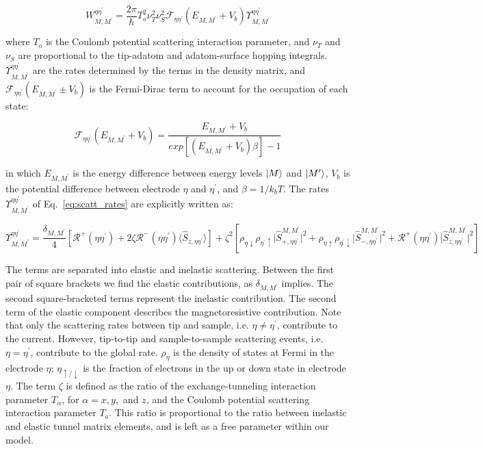 \documentclass[reprint,amsmath,amssymb,aps,nofootinbib,onecolumn]{revtex4-2}
\begin{document}
\begin{equation}
W_{M,M^{\prime}}^{\eta \eta^{\prime}}=\frac{2 \pi}{\hbar} T_o^2 \nu_T^2 \nu_S^2 \mathcal{F}_{\eta\eta^{\prime}}(E_{M,M^{\prime}} + V_{b})\Upsilon^{\eta\eta^{\prime}}_{M,M^{\prime}}
\label{eq:scatt_rates}
\end{equation}

where $T_{o}$ is the Coulomb potential scattering interaction parameter, and $\nu_T$ and $\nu_S$ are proportional to the tip-adatom and adatom-surface hopping integrals. 
$\Upsilon^{\eta\eta^{\prime}}_{M,M^{\prime}}$ are the rates determined by the terms in the density matrix, and $\mathcal{F}_{\eta\eta^{\prime}}(E_{M,M^{\prime}}\pm V_b )$ is the Fermi-Dirac term to account for the occupation of each state:

\begin{equation}
\mathcal{F}_{\eta\eta^{\prime}}(E_{M,M^{\prime}}+ V_{b} )=\dfrac{E_{M,M^{\prime}}+ V_{b}}{exp\left[\left( E_{M,M^{\prime}}+ V_{b}  \right)\beta\right]-1}
\label{eq:fermi_conv}
\end{equation}

in which $E_{M,M^{\prime}}$ is the energy difference between energy levels $\ket{M}$ and $\ket{M^{\prime}}$, $V_{b}$ is the potential difference between electrode $\eta$ and $\eta^{\prime}$, and $\beta=1/k_b T$. The rates $\Upsilon^{\eta\eta^{\prime}}_{M,M^{\prime}}$ of Eq.~\ref{eq:scatt_rates} are explicitly written as:

\begin{equation}
\label{eq:ups} 
    \Upsilon^{\eta\eta^{\prime}}_{M,M^{\prime}}=\dfrac{\delta_{M,M^{\prime}}}{4}\left[  \mathcal{R}^{+}(\eta\eta^{\prime})+ 2\zeta \mathcal{R}^{-}(\eta\eta^{\prime})\langle \hat{S}_{z,\eta\eta^{\prime}} \rangle \right] + \zeta^{2}\left[ \rho_{\eta \downarrow} \rho_{\eta^{\prime}\uparrow} \lvert \hat{S}_{+,\eta\eta^{\prime}}^{M,M^{\prime}}\rvert^{2} + \rho_{\eta \uparrow} \rho_{\eta^{\prime}\downarrow} \lvert {\hat{S}_{-,\eta\eta^{\prime}}^{M,M^{\prime}}}\rvert^{2} +\mathcal{R}^{+}(\eta\eta^{\prime})\lvert \hat{S}_{z,\eta\eta^{\prime}}^{M,M^{\prime}}\rvert^{2} \right]
\end{equation}

The terms are separated into elastic and inelastic scattering. Between the first pair of square brackets we find the elastic contributions, as $\delta_{M,M^{\prime}}$ implies. The second square-bracketed terms represent the inelastic contribution.
The second term of the elastic component describes the magnetoresistive contribution. Note that only the scattering rates between tip and sample, i.e. $\eta\neq\eta^{\prime}$, contribute to the current. However, tip-to-tip and sample-to-sample scattering events, i.e. $\eta=\eta^{\prime}$, contribute to the global rate. $\rho_{\eta}$ is the density of states at Fermi in the electrode $\eta$; $\eta_{\uparrow / \downarrow}$ is the fraction of electrons in the up or down state in electrode $\eta$. The term $\zeta$ is defined as the ratio of the exchange-tunneling interaction parameter $T_{\alpha}$, for $\alpha = x, y,$ and $z$, and the Coulomb potential scattering interaction parameter $T_{o}$. This ratio is proportional to the ratio between inelastic and elastic tunnel matrix elements, and is left as a free parameter within our model. 
\end{document}
